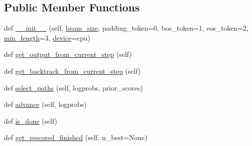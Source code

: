\subsection*{Public Member Functions}
\begin{DoxyCompactItemize}
\item 
def \hyperlink{classparlai_1_1core_1_1torch__generator__agent_1_1TreeSearch_aeb69e8fa4faed027eaacd69bc3148dce}{\+\_\+\+\_\+init\+\_\+\+\_\+} (self, \hyperlink{classparlai_1_1core_1_1torch__generator__agent_1_1TreeSearch_a2381c33e5233a5f5c1e50c65ab0ee572}{beam\+\_\+size}, padding\+\_\+token=0, bos\+\_\+token=1, eos\+\_\+token=2, \hyperlink{classparlai_1_1core_1_1torch__generator__agent_1_1TreeSearch_a71d6802f40cf025cd5c0242070d78b62}{min\+\_\+length}=3, \hyperlink{classparlai_1_1core_1_1torch__generator__agent_1_1TreeSearch_a37b3f7f827909e3aa2d8e35c32c41e81}{device}=\textquotesingle{}cpu\textquotesingle{})
\item 
def \hyperlink{classparlai_1_1core_1_1torch__generator__agent_1_1TreeSearch_a929ecbf60f149968caae5a0a6908d67a}{get\+\_\+output\+\_\+from\+\_\+current\+\_\+step} (self)
\item 
def \hyperlink{classparlai_1_1core_1_1torch__generator__agent_1_1TreeSearch_aced42f37b580f876286b5075ba188b2a}{get\+\_\+backtrack\+\_\+from\+\_\+current\+\_\+step} (self)
\item 
def \hyperlink{classparlai_1_1core_1_1torch__generator__agent_1_1TreeSearch_a004609539d0428a9351a991168eb370b}{select\+\_\+paths} (self, logprobs, prior\+\_\+scores)
\item 
def \hyperlink{classparlai_1_1core_1_1torch__generator__agent_1_1TreeSearch_a9f371e57095af5b22ff5eae4c57326c8}{advance} (self, logprobs)
\item 
def \hyperlink{classparlai_1_1core_1_1torch__generator__agent_1_1TreeSearch_a35a3cbfe2df2d02bb46f7e492657afa5}{is\+\_\+done} (self)
\item 
def \hyperlink{classparlai_1_1core_1_1torch__generator__agent_1_1TreeSearch_a4b70f85eec7d81b3a0e1afaea5b09332}{get\+\_\+rescored\+\_\+finished} (self, n\+\_\+best=None)
\end{DoxyCompactItemize}
